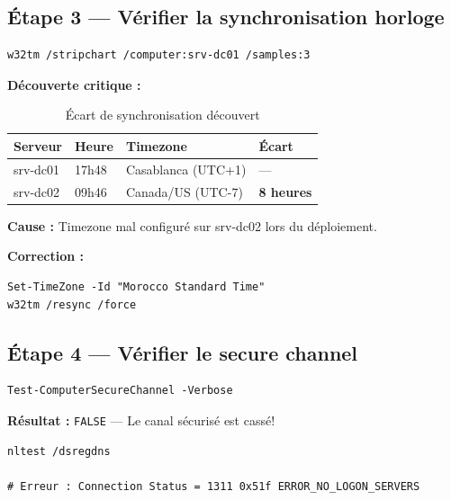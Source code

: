 \subsection{Étape 3 — Vérifier la synchronisation horloge}

\begin{lstlisting}[style=powershell]
w32tm /stripchart /computer:srv-dc01 /samples:3
\end{lstlisting}

\textbf{Découverte critique :}

\begin{table}[H]
    \centering
    \begin{tabularx}{\textwidth}{|l|l|l|l|}
        \hline
        \textbf{Serveur} & \textbf{Heure} & \textbf{Timezone} & \textbf{Écart} \\
        \hline
        srv-dc01 & 17h48 & Casablanca (UTC+1) & — \\
        \hline
        srv-dc02 & 09h46 & Canada/US (UTC-7) & \textbf{8 heures} \\
        \hline
    \end{tabularx}
    \caption{Écart de synchronisation découvert}
    \label{tab:time-diff}
\end{table}

\textbf{Cause :} Timezone mal configuré sur srv-dc02 lors du déploiement.

\textbf{Correction :}

\begin{lstlisting}[style=powershell]
Set-TimeZone -Id "Morocco Standard Time"
w32tm /resync /force
\end{lstlisting}

\subsection{Étape 4 — Vérifier le secure channel}

\begin{lstlisting}[style=powershell]
Test-ComputerSecureChannel -Verbose
\end{lstlisting}

\textbf{Résultat :} \texttt{FALSE} — Le canal sécurisé est cassé!

\begin{lstlisting}[style=powershell]
nltest /dsregdns

# Erreur : Connection Status = 1311 0x51f ERROR_NO_LOGON_SERVERS
\end{lstlisting}

